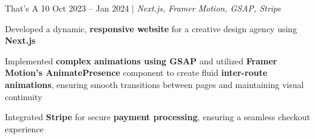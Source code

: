 \resumeSubheadings
{That's A 10 }
{Oct 2023 -- Jan 2024}
{}{}{| \textit{Next.js, Framer Motion, GSAP, Stripe}}
\resumeItemListStart
\item Developed a dynamic, \textbf{responsive website} for a creative design agency using \textbf{Next.js}
\item Implemented \textbf{complex animations using GSAP} and utilized \textbf{Framer Motion's AnimatePresence} component to create fluid \textbf{inter-route animations}, ensuring smooth transitions between pages and maintaining visual continuity
\item Integrated \textbf{Stripe} for secure \textbf{payment processing}, ensuring a seamless checkout experience
\resumeItemListEnd